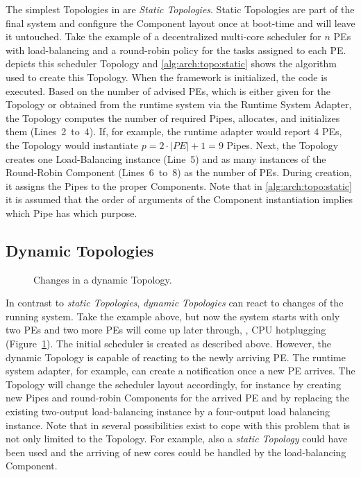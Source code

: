 The simplest Topologies in \cobas{} are \emph{Static Topologies}. Static Topologies are part of the final system and configure the Component layout once at boot-time and will leave it untouched. Take the example of a decentralized multi-core scheduler for \(n\) \acp{PE} with load-balancing and a round-robin policy for the tasks assigned to each \ac{PE}.  depicts this scheduler Topology and \cref{alg:arch:topo:static} shows the algorithm used to create this Topology. When the \cobas{} framework is initialized, the code is executed. Based on the number of advised \acp{PE}, which is either given for the Topology or obtained from the runtime system via the Runtime System Adapter, the Topology computes the number of required Pipes, allocates, and initializes them (Lines~2~to~4). If, for example, the runtime adapter would report \(4\) \acp{PE}, the Topology would instantiate \(p = 2 \cdot |PE| + 1 = 9\) Pipes. Next, the Topology creates one Load-Balancing instance (Line~5) and as many instances of the Round-Robin Component (Lines~6~to~8) as the number of \acp{PE}. During creation, it assigns the Pipes to the proper Components. Note that in \cref{alg:arch:topo:static} it is assumed that the order of arguments of the Component instantiation implies which Pipe has which purpose.

\subsection{Dynamic Topologies}%
\label{sec:arch:topologies:dynamic}

\begin{figure}[t!] \centering
	\caption[Changes in a dynamic Topology.]{Changes in a dynamic Topology.}%
	\label{fig:arch:topo:dynamic}
\end{figure}

In contrast to \emph{static Topologies}, \emph{dynamic Topologies} can react to changes of the running system. Take the example above, but now the system starts with only two \acp{PE} and two more \acp{PE} will come up later through, \eg{}, CPU hotplugging (Figure~\ref{fig:arch:topo:dynamic}). The initial scheduler is created as described above. However, the dynamic Topology is capable of reacting to the newly arriving \ac{PE}. The runtime system adapter, for example, can create a notification once a new \ac{PE} arrives. The Topology will change the scheduler layout accordingly, for instance by creating new Pipes and round-robin Components for the arrived \ac{PE} and by replacing the existing two-output load-balancing instance by a four-output load balancing instance. Note that in \cobas{} several possibilities exist to cope with this problem that is not only limited to the Topology. For example, also a \emph{static Topology} could have been used and the arriving of new cores could be handled by the load-balancing Component.

